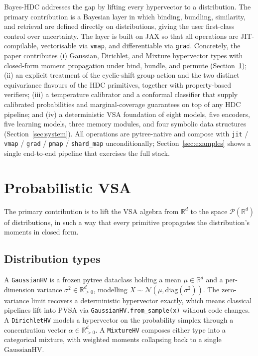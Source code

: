 \documentclass[twoside,11pt]{article}
\begin{document}
Bayes-HDC addresses the gap by lifting every hypervector to a distribution. The primary contribution is a Bayesian layer in which binding, bundling, similarity, and retrieval are defined directly on distributions, giving the user first-class control over uncertainty. The layer is built on JAX \citep{jax2018github} so that all operations are JIT-compilable, vectorisable via \texttt{vmap}, and differentiable via \texttt{grad}. Concretely, the paper contributes (i) Gaussian, Dirichlet, and Mixture hypervector types with closed-form moment propagation under bind, bundle, and permute (Section~\ref{sec:pvsa}); (ii) an explicit treatment of the cyclic-shift group action and the two distinct equivariance flavours of the HDC primitives, together with property-based verifiers; (iii) a temperature calibrator and a conformal classifier that supply calibrated probabilities and marginal-coverage guarantees on top of any HDC pipeline; and (iv) a deterministic VSA foundation of eight models, five encoders, five learning models, three memory modules, and four symbolic data structures (Section~\ref{sec:system}). All operations are pytree-native and compose with \texttt{jit} / \texttt{vmap} / \texttt{grad} / \texttt{pmap} / \texttt{shard\_map} unconditionally; Section~\ref{sec:examples} shows a single end-to-end pipeline that exercises the full stack.

\section{Probabilistic VSA}
\label{sec:pvsa}

The primary contribution is to lift the VSA algebra from $\mathbb{R}^d$ to the space $\mathcal{P}(\mathbb{R}^d)$ of distributions, in such a way that every primitive propagates the distribution's moments in closed form.

\subsection{Distribution types}

A \texttt{GaussianHV} is a frozen pytree dataclass holding a mean $\mu \in \mathbb{R}^d$ and a per-dimension variance $\sigma^2 \in \mathbb{R}_{\geq 0}^d$, modelling $X \sim \mathcal{N}(\mu, \mathrm{diag}(\sigma^2))$. The zero-variance limit recovers a deterministic hypervector exactly, which means classical pipelines lift into PVSA via \texttt{GaussianHV.from\_sample(x)} without code changes. A \texttt{DirichletHV} models a hypervector on the probability simplex through a concentration vector $\alpha \in \mathbb{R}_{>0}^d$. A \texttt{MixtureHV} composes either type into a categorical mixture, with weighted moments collapsing back to a single $\mathrm{GaussianHV}$.
\end{document}
